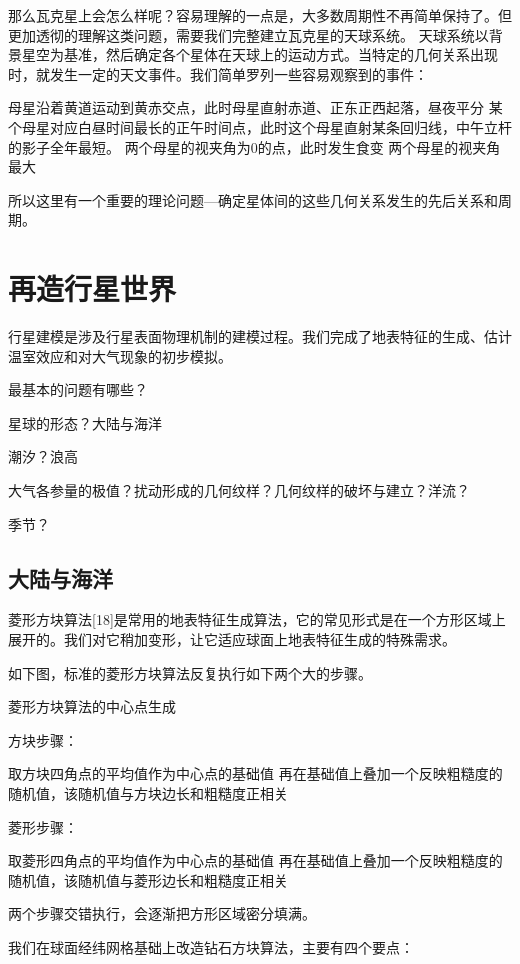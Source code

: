\documentclass[a4paper,10.5pt]{book}
\begin{document}
那么瓦克星上会怎么样呢？容易理解的一点是，大多数周期性不再简单保持了。但更加透彻的理解这类问题，需要我们完整建立瓦克星的天球系统。
天球系统以背景星空为基准，然后确定各个星体在天球上的运动方式。当特定的几何关系出现时，就发生一定的天文事件。我们简单罗列一些容易观察到的事件：

母星沿着黄道运动到黄赤交点，此时母星直射赤道、正东正西起落，昼夜平分
某个母星对应白昼时间最长的正午时间点，此时这个母星直射某条回归线，中午立杆的影子全年最短。
两个母星的视夹角为0的点，此时发生食变
两个母星的视夹角最大

所以这里有一个重要的理论问题—确定星体间的这些几何关系发生的先后关系和周期。




\chapter{再造行星世界}

行星建模是涉及行星表面物理机制的建模过程。我们完成了地表特征的生成、估计温室效应和对大气现象的初步模拟。

最基本的问题有哪些？

星球的形态？大陆与海洋

潮汐？浪高

大气各参量的极值？扰动形成的几何纹样？几何纹样的破坏与建立？洋流？

季节？

\section{大陆与海洋}

菱形方块算法[18]是常用的地表特征生成算法，它的常见形式是在一个方形区域上展开的。我们对它稍加变形，让它适应球面上地表特征生成的特殊需求。

如下图，标准的菱形方块算法反复执行如下两个大的步骤。


菱形方块算法的中心点生成

方块步骤：

取方块四角点的平均值作为中心点的基础值
再在基础值上叠加一个反映粗糙度的随机值，该随机值与方块边长和粗糙度正相关

菱形步骤：

取菱形四角点的平均值作为中心点的基础值
再在基础值上叠加一个反映粗糙度的随机值，该随机值与菱形边长和粗糙度正相关

两个步骤交错执行，会逐渐把方形区域密分填满。

我们在球面经纬网格基础上改造钻石方块算法，主要有四个要点：
\end{document}
